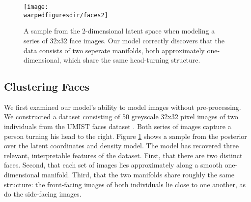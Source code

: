 \begin{figure}[t!]
\centering
\texttt{[image: \\warpedfiguresdir/faces2]}
\caption[Latent clusters of face images]{A sample from the 2-dimensional latent space when modeling a series of 32x32 face images.  Our model correctly discovers that the data consists of two seperate manifolds, both approximately one-dimensional, which share the same head-turning structure.}
\label{fig:faces}
\end{figure}

\subsection{Clustering Faces}

We first examined our model's ability to model images without pre-processing.  We constructed a dataset consisting of 50 greyscale 32x32 pixel images of two individuals from the UMIST faces dataset \cite{umistfaces}.  Both series of images capture a person turning his head to the right.  Figure \ref{fig:faces} shows a sample from the posterior over the latent coordinates and density model.  The model has recovered three relevant, interpretable features of the dataset.  First, that there are two distinct faces.  Second, that each set of images lies approximately along a smooth one-dimensional manifold.  Third, that the two manifolds share roughly the same structure: the front-facing images of both individuals lie close to one another, as do the side-facing images.

